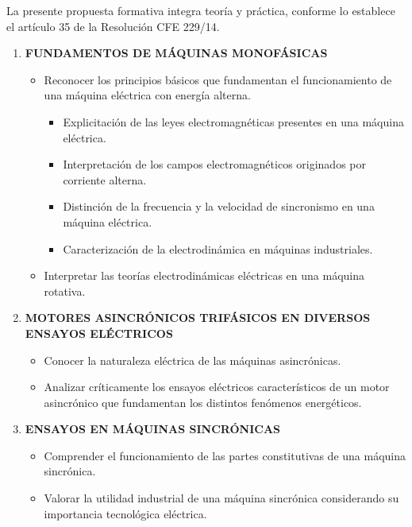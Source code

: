 \documentclass[a4paper,12pt]{article}
\begin{document}
La presente propuesta formativa integra teoría y práctica, conforme lo establece el artículo 35 de la Resolución CFE 229/14.

\vspace{0.5cm}

\begin{enumerate}[label=\textbf{\arabic*.}, leftmargin=*]
    \item \textbf{FUNDAMENTOS DE MÁQUINAS MONOFÁSICAS}
    \begin{itemize}
        \item Reconocer los principios básicos que fundamentan el funcionamiento de una máquina eléctrica con energía alterna.
        \begin{itemize}
            \item Explicitación de las leyes electromagnéticas presentes en una máquina eléctrica.
            \item Interpretación de los campos electromagnéticos originados por corriente alterna.
            \item Distinción de la frecuencia y la velocidad de sincronismo en una máquina eléctrica.
            \item Caracterización de la electrodinámica en máquinas industriales.
        \end{itemize}
        \item Interpretar las teorías electrodinámicas eléctricas en una máquina rotativa.
    \end{itemize}
    \item \textbf{MOTORES ASINCRÓNICOS TRIFÁSICOS EN DIVERSOS ENSAYOS ELÉCTRICOS}
    \begin{itemize}
        \item Conocer la naturaleza eléctrica de las máquinas asincrónicas.
        \item Analizar críticamente los ensayos eléctricos característicos de un motor asincrónico que fundamentan los distintos fenómenos energéticos.
    \end{itemize}
    \item \textbf{ENSAYOS EN MÁQUINAS SINCRÓNICAS}
    \begin{itemize}
        \item Comprender el funcionamiento de las partes constitutivas de una máquina sincrónica.
        \item Valorar la utilidad industrial de una máquina sincrónica considerando su importancia tecnológica eléctrica.
    \end{itemize}
\end{enumerate}
\end{document}
